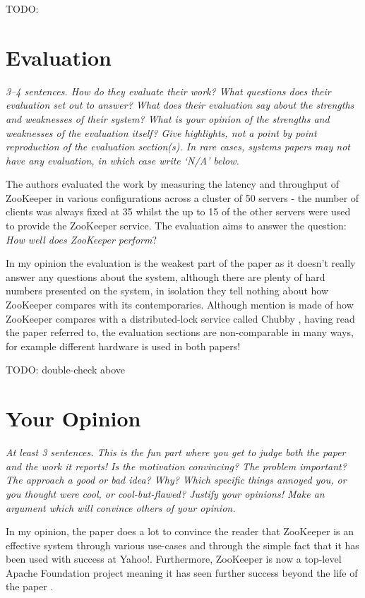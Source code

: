 \documentclass[11pt]{article}
\begin{document}
TODO:


\section*{Evaluation}

\textsl{3--4 sentences. How do they evaluate their work? What questions does
their evaluation set out to answer? What does their evaluation say about the
strengths and weaknesses of their system? What is your opinion of the strengths
and weaknesses of the evaluation itself? Give highlights, not a point by point
reproduction of the evaluation section(s). In rare cases, systems papers may
not have any evaluation, in which case write `N/A' below.}

The authors evaluated the work by measuring the latency and throughput of
ZooKeeper in various configurations across a cluster of 50 servers - the number
of clients was always fixed at 35 whilst the up to 15 of the other servers were
used to provide the ZooKeeper service. The evaluation aims to answer the
question: \textit{How well does ZooKeeper perform}?

In my opinion the evaluation is the weakest part of the paper as it doesn't
really answer any questions about the system, although there are plenty of hard
numbers presented on the system, in isolation they tell nothing about how
ZooKeeper compares with its contemporaries. Although mention is made of how
ZooKeeper compares with a distributed-lock service called Chubby \cite{Chubby},
having read the paper referred to, the evaluation sections are non-comparable
in many ways, for example different hardware is used in both papers!

TODO: double-check above

\section*{Your Opinion}

\textsl{At least 3 sentences. This is the fun part where you get to judge both
the paper and the work it reports! Is the motivation convincing? The problem
important? The approach a good or bad idea? Why? Which specific things annoyed
you, or you thought were cool, or cool-but-flawed? Justify your opinions! Make
an argument which will convince others of your opinion.}

 In my opinion, the paper does a lot to convince the reader that ZooKeeper is
 an effective system through various use-cases and through the simple fact that
 it has been used with success at Yahoo!. Furthermore, ZooKeeper is now a
 top-level Apache Foundation project meaning it has seen further success beyond
 the life of the paper \cite{ApacheZooKeeper}.
\end{document}
